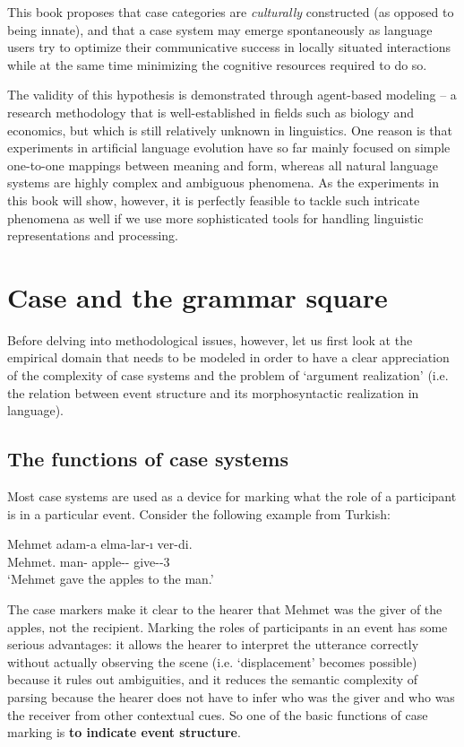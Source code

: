 This book proposes that case categories are {\em culturally} constructed (as opposed to being innate), and that a case system may emerge spontaneously as language users try to optimize their communicative success in locally situated interactions while at the same time minimizing the cognitive resources required to do so. 

The validity of this hypothesis is demonstrated through agent-based modeling -- a research methodology that is well-established in fields such as biology and economics, but which is still relatively unknown in linguistics. One reason is that experiments in artificial language evolution have so far mainly focused on simple one-to-one mappings between meaning and form, whereas all natural language systems are highly complex and ambiguous phenomena. As the experiments in this book will show, however, it is perfectly feasible to tackle such intricate phenomena as well if we use more sophisticated tools for handling linguistic representations and processing. 

\section{Case and the grammar square}
\label{s:grammar-square}

Before delving into methodological issues, however, let us first look at the empirical domain that needs to be modeled in order to have a clear appreciation of the complexity of case systems and the problem of `argument realization' (i.e. the relation between event structure and its morphosyntactic realization in language).

\subsection{The functions of case systems}
\label{s:case-functions}

Most case systems are used as a device for marking what the role of a participant is in a particular event. Consider the following example from Turkish:

\label{e:case1}
\ea
\gll Mehmet adam-a elma-lar-ı ver-di. \\
	Mehmet.{\nom} man-{\dat} apple-{\pl}-{\acc} give-{\pst}-3{\sg} \\
\glt `Mehmet gave the apples to the man.' \citep[1, example 1]{blake94case}
\z

The case markers make it clear to the hearer that Mehmet was the giver of the apples, not the recipient. Marking the roles of participants in an event has some serious advantages: it allows the hearer to interpret the utterance correctly without actually observing the scene (i.e. `displacement' becomes possible) because it rules out ambiguities, and it reduces the semantic complexity of parsing because the hearer does not have to infer who was the giver and who was the receiver from other contextual cues. So one of the basic functions of case marking is {\bfseries to indicate event structure}.

